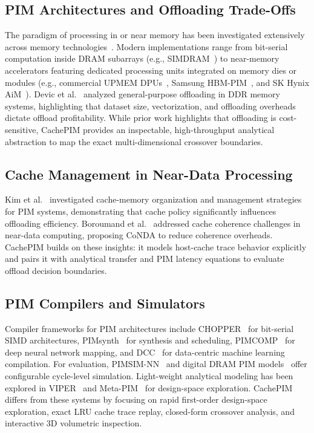 \documentclass[journal,10pt,twocolumn]{IEEEtran}
\begin{document}
\subsection{PIM Architectures and Offloading Trade-Offs}
The paradigm of processing in or near memory has been investigated extensively across memory technologies~\cite{Asifuzzaman2023,Mutlu2023,Ghose2019}. Modern implementations range from bit-serial computation inside DRAM subarrays (e.g., SIMDRAM~\cite{Hajinazar2021}) to near-memory accelerators featuring dedicated processing units integrated on memory dies or modules (e.g., commercial UPMEM DPUs~\cite{GomezLuna2022}, Samsung HBM-PIM~\cite{Kwon2021}, and SK Hynix AiM~\cite{Lee2022}). Devic et al.~\cite{Devic2022} analyzed general-purpose offloading in DDR memory systems, highlighting that dataset size, vectorization, and offloading overheads dictate offload profitability. While prior work highlights that offloading is cost-sensitive, CachePIM provides an inspectable, high-throughput analytical abstraction to map the exact multi-dimensional crossover boundaries.

\subsection{Cache Management in Near-Data Processing}
Kim et al.~\cite{Kim2019} investigated cache-memory organization and management strategies for PIM systems, demonstrating that cache policy significantly influences offloading efficiency. Boroumand et al.~\cite{Boroumand2019} addressed cache coherence challenges in near-data computing, proposing CoNDA to reduce coherence overheads. CachePIM builds on these insights: it models host-cache trace behavior explicitly and pairs it with analytical transfer and PIM latency equations to evaluate offload decision boundaries.

\subsection{PIM Compilers and Simulators}
Compiler frameworks for PIM architectures include CHOPPER~\cite{Peng2023} for bit-serial SIMD architectures, PIMsynth~\cite{Guo2025} for synthesis and scheduling, PIMCOMP~\cite{Sun2025} for deep neural network mapping, and DCC~\cite{Yang2026} for data-centric machine learning compilation. For evaluation, PIMSIM-NN~\cite{Wang2024} and digital DRAM PIM models~\cite{Siddique2024} offer configurable cycle-level simulation. Light-weight analytical modeling has been explored in VIPER~\cite{Geng2026} and Meta-PIM~\cite{Zhang2026} for design-space exploration. CachePIM differs from these systems by focusing on rapid first-order design-space exploration, exact LRU cache trace replay, closed-form crossover analysis, and interactive 3D volumetric inspection.
\end{document}
